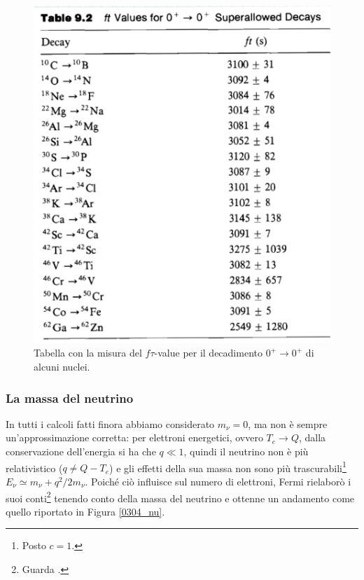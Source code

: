\begin{figure}
    \centering
    \includegraphics[scale=0.2]{Immagini/0304_dati.png}
    \caption{Tabella con la misura del $f\tau$-value per il decadimento $0^+\to0^+$ di alcuni nuclei.}
    \label{0304_dati2}
\end{figure}

\subsubsection{La massa del neutrino}\label{sec-nu-mass}
In tutti i calcoli fatti finora abbiamo considerato $m_\nu=0$, ma non è sempre un'approssimazione corretta: per elettroni energetici, ovvero $T_e\to Q$, dalla conservazione dell'energia si ha che $q\ll 1$, quindi il neutrino non è più relativistico ($q\not = Q-T_e$) e gli effetti della sua massa non sono più trascurabili\footnote{Posto $c=1$.} $E_\nu \simeq m_\nu + q^2/2m_\nu$. Poiché ciò influisce sul numero di elettroni, Fermi rielaborò i suoi conti\footnote{Guarda .} tenendo conto della massa del neutrino e ottenne un andamento come quello riportato in Figura \ref{0304_nu}.

